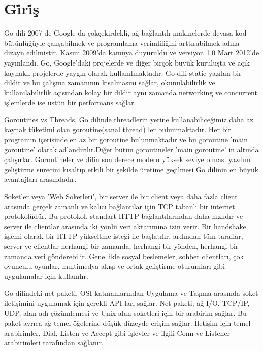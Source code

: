 \chapter{G\.{i}r\.{i}ş}
\thispagestyle{empty}
\setcounter{page}{1}

\justify
\begin{small}
\setlength{\parindent}{1cm}
\hspace{0.8cm}




\vspace{30mm}
Go dili 2007 de Google da çokçekirdekli, ağ bağlantılı makinelerde devasa kod bütünlüğüyle çalışabilmek ve programlama verimliliğini arttırabilmek adına dizayn edilmistir. Kasım 2009'da kamuya duyuruldu ve versiyon 1.0 Mart 2012'de yayınlandı. Go, Google'daki projelerde ve diğer birçok büyük kuruluşta ve açık kaynaklı projelerde yaygın olarak kullanılmaktadır. Go dili static yazılan bir dildir ve bu çalışma zamanının kısalmasını sağlar, okunulabilirlik ve kullanılabilirlik açısından kolay bir dildir aynı zamanda networking ve concurrent işlemlerde ise üstün bir performans sağlar.

Goroutines vs Threads, Go dilinde threadlerin yerine kullanabiliceğimiz
daha az kaynak tüketimi olan goroutine(sanal thread) ler bulunmaktadır. Her bir programın içerisinde en az bir goroutine bulunmaktadır ve bu goroutine ’main goroutine’ olarak adlandırılır.Diğer bütün goroutineler ’main goroutine’ in altında çalışırlar. Goroutineler ve dilin son derece modern yüksek seviye olması yazılım geliştirme sürecini kısaltıp etkili bir şekilde üretime geçilmesi Go dilinin en büyük avantajları arasındadır. 

Soketler veya 'Web Soketleri', bir server ile bir client veya daha fazla client arasında gerçek zamanlı ve kalıcı bağlantılar için TCP tabanlı bir internet protokolüdür. Bu protokol, standart HTTP bağlantılarından daha hızlıdır ve server ile clientlar arasında iki yönlü veri aktarımına izin verir. Bir handshake işlemi olarak bir HTTP yükseltme isteği ile başlatılır, ardından tüm taraflar, server ve clientlar herhangi bir zamanda, herhangi bir yönden, herhangi bir zamanda veri gönderebilir. Genellikle sosyal beslemeler, sohbet clientları, çok oyunculu oyunlar, multimedya akışı ve ortak geliştirme oturumları gibi uygulamalar için kullanılır.

Go dilindeki net paketi, OSI katmanlarından Uygulama ve Taşıma arasında soket iletişimini uygulamak için gerekli API ları sağlar. Net paketi, ağ I/O, TCP/IP, UDP, alan adı çözümlemesi ve Unix alan soketleri için bir arabirim sağlar. Bu paket ayrıca ağ temel öğelerine düşük düzeyde erişim sağlar. İletişim için temel arabirimler, Dial, Listen ve Accept gibi işlevler ve ilgili Conn ve Listener arabirimleri tarafından sağlanır.
\\

\end{small}